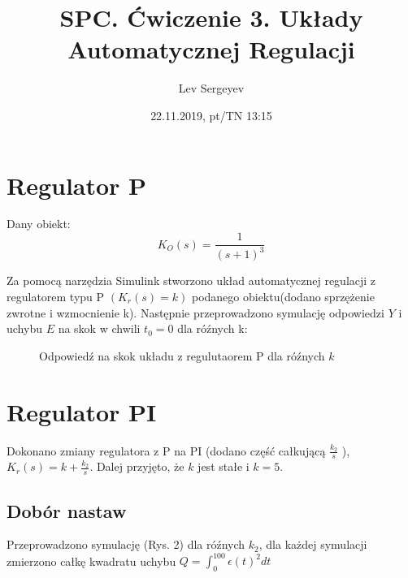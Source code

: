 \documentclass{article}
\author{Lev Sergeyev}
\title{SPC. Ćwiczenie 3. Układy Automatycznej Regulacji}
\date{22.11.2019, pt/TN 13:15}
\begin{document}
\maketitle



\section{Regulator P}
\par
Dany obiekt:
\begin{equation}
K_O(s)=\frac{1}{(s+1)^3} 
\end{equation}

Za pomocą narzędzia Simulink stworzono układ automatycznej regulacji z regulatorem typu P \( (K_{r}(s) = k ) \) podanego obiektu(dodano sprzężenie zwrotne i wzmocnienie k).
Następnie przeprowadzono symulację odpowiedzi \(Y\) i uchybu \(E\) na skok w chwili \(t_0 = 0\) dla róźnych k:
\begin{figure}[h]
\centering
{}
\caption{Odpowiedź na skok układu z regulutaorem P dla róźnych \(k\)}
\end{figure}


\section{Regulator PI}

Dokonano zmiany regulatora z P na PI (dodano część całkującą \(\frac{k_2}{s} \) ), \(K_{r}(s) = k+ \frac{k_2}{s} \). Dalej przyjęto, że \(k\) jest stałe i \(k = 5\).

\subsection{Dobór nastaw}
Przeprowadzono symulację (Rys. 2) dla róźnych \(k_2\), dla każdej symulacji zmierzono całkę kwadratu uchybu \( Q = \int_{0}^{100} \epsilon(t)^2  dt\) 
\end{document}
